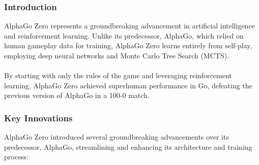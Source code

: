 \subsubsection{Introduction}
AlphaGo Zero represents a groundbreaking advancement in artificial intelligence
and reinforcement learning. Unlike its predecessor, AlphaGo, which relied on
human gameplay data for training, AlphaGo Zero learns entirely from self-play,
employing deep neural networks and Monte Carlo Tree Search (MCTS). \cite{agz1}
\\\\ By starting with only the rules of the game and leveraging reinforcement
learning, AlphaGo Zero achieved superhuman performance in Go, defeating the
previous version of AlphaGo in a 100-0 match.
\subsubsection{Key Innovations}

AlphaGo Zero introduced several groundbreaking advancements over its
predecessor, AlphaGo, streamlining and enhancing its architecture and training
process:

